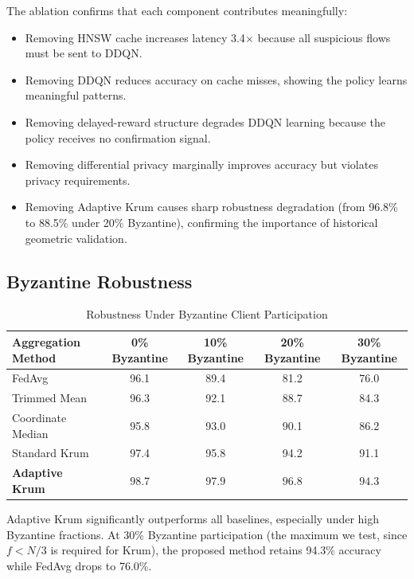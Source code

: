 \documentclass[preprint,12pt]{elsarticle}
\begin{document}
The ablation confirms that each component contributes meaningfully:

\begin{itemize}[leftmargin=1.2em]
    \item Removing HNSW cache increases latency 3.4$\times$ because all suspicious flows must be sent to DDQN.
    \item Removing DDQN reduces accuracy on cache misses, showing the policy learns meaningful patterns.
    \item Removing delayed-reward structure degrades DDQN learning because the policy receives no confirmation signal.
    \item Removing differential privacy marginally improves accuracy but violates privacy requirements.
    \item Removing Adaptive Krum causes sharp robustness degradation (from 96.8\% to 88.5\% under 20\% Byzantine), confirming the importance of historical geometric validation.
\end{itemize}

\subsection{Byzantine Robustness}

\begin{table}[!t]
\caption{Robustness Under Byzantine Client Participation}
\label{tab:byzantine}
\centering
\small
\begin{tabular}{@{}lcccc@{}}
\toprule
\textbf{Aggregation Method} & \textbf{0\% Byzantine} & \textbf{10\% Byzantine} & \textbf{20\% Byzantine} & \textbf{30\% Byzantine} \\
\midrule
FedAvg & 96.1 & 89.4 & 81.2 & 76.0 \\
Trimmed Mean & 96.3 & 92.1 & 88.7 & 84.3 \\
Coordinate Median & 95.8 & 93.0 & 90.1 & 86.2 \\
Standard Krum & 97.4 & 95.8 & 94.2 & 91.1 \\
\textbf{Adaptive Krum} & $\mathbf{98.7}$ & $\mathbf{97.9}$ & $\mathbf{96.8}$ & $\mathbf{94.3}$ \\
\bottomrule
\end{tabular}
\end{table}

Adaptive Krum significantly outperforms all baselines, especially under high Byzantine fractions. At 30\% Byzantine participation (the maximum we test, since $f < N/3$ is required for Krum), the proposed method retains 94.3\% accuracy while FedAvg drops to 76.0\%.
\end{document}
